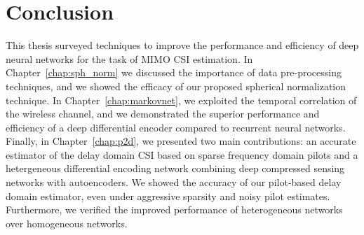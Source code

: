 \chapter{Conclusion} \label{chap:conclusion}

This thesis surveyed techniques to improve the performance and efficiency of deep neural networks for the task of MIMO CSI estimation. In Chapter~\ref{chap:sph_norm} we discussed the importance of data pre-processing techniques, and we showed the efficacy of our proposed spherical normalization technique. In Chapter~\ref{chap:markovnet}, we exploited the temporal correlation of the wireless channel, and we demonstrated the superior performance and efficiency of a deep differential encoder compared to recurrent neural networks. Finally, in Chapter~\ref{chap:p2d}, we presented two main contributions: an accurate estimator of the delay domain CSI based on sparse frequency domain pilots and a hetergeneous differential encoding network combining deep compressed sensing networks with autoencoders. We showed the accuracy of our pilot-based delay domain estimator, even under aggressive sparsity and noisy pilot estimates. Furthermore, we verified the improved performance of heterogeneous networks over homogeneous networks.